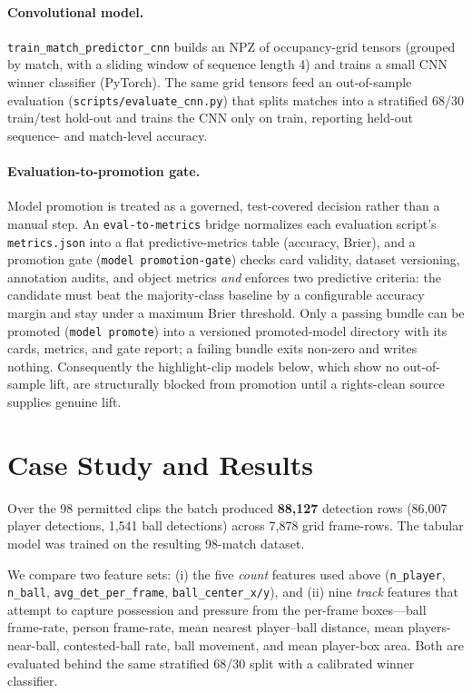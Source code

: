 \documentclass[11pt]{article}
\begin{document}
\paragraph{Convolutional model.} \texttt{train\_match\_predictor\_cnn} builds an
NPZ of occupancy-grid tensors (grouped by match, with a sliding window of
sequence length 4) and trains a small CNN winner classifier (PyTorch). The
same grid tensors feed an out-of-sample evaluation (\texttt{scripts/evaluate\_cnn.py})
that splits matches into a stratified 68/30 train/test hold-out and trains the
CNN only on train, reporting held-out sequence- and match-level accuracy.

\paragraph{Evaluation-to-promotion gate.} Model promotion is treated as a
governed, test-covered decision rather than a manual step. An
\texttt{eval-to-metrics} bridge normalizes each evaluation script's
\texttt{metrics.json} into a flat predictive-metrics table (accuracy, Brier), and
a promotion gate (\texttt{model promotion-gate}) checks card validity, dataset
versioning, annotation audits, and object metrics \emph{and} enforces two
predictive criteria: the candidate must beat the majority-class baseline by a
configurable accuracy margin and stay under a maximum Brier threshold. Only a
passing bundle can be promoted (\texttt{model promote}) into a versioned
promoted-model directory with its cards, metrics, and gate report; a failing
bundle exits non-zero and writes nothing. Consequently the highlight-clip models
below, which show no out-of-sample lift, are structurally blocked from promotion
until a rights-clean source supplies genuine lift.

\section{Case Study and Results}
Over the 98 permitted clips the batch produced \textbf{88,127} detection rows
(86,007 player detections, 1,541 ball detections) across 7,878 grid frame-rows.
The tabular model was trained on the resulting 98-match dataset.

We compare two feature sets: (i) the five \emph{count} features used above
(\texttt{n\_player}, \texttt{n\_ball}, \texttt{avg\_det\_per\_frame},
\texttt{ball\_center\_x/y}), and (ii) nine \emph{track} features that attempt to
capture possession and pressure from the per-frame boxes---ball frame-rate,
person frame-rate, mean nearest player--ball distance, mean players-near-ball,
contested-ball rate, ball movement, and mean player-box area. Both are evaluated
behind the same stratified 68/30 split with a calibrated winner classifier.
\end{document}
